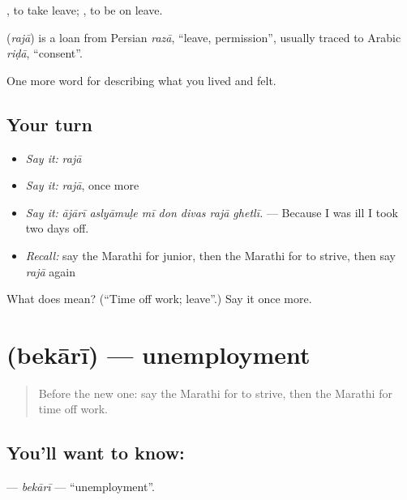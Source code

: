  , to take leave;  , to be on leave.

\begin{cousinweb}
\textbf{} (\emph{rajā}) is a loan from Persian \emph{razā}, \textquotedblleft{}leave, permission\textquotedblright{}, usually traced to Arabic \emph{riḍā}, \textquotedblleft{}consent\textquotedblright{}.
\end{cousinweb}

\begin{grammarlens}[title={What you've built}]
One more word for describing what you lived and felt.
\end{grammarlens}

\subsection*{Your turn}
\begin{itemize}
\raggedright
  \item \emph{Say it:} \emph{rajā}
  \item \emph{Say it:} \emph{rajā}, once more
  \item \emph{Say it:} \emph{ājārī aslyāmuḷe mī don divas rajā ghetlī.} — Because I was ill I took two days off.
  \item \emph{Recall:} say the Marathi for junior, then the Marathi for to strive, then say \emph{rajā} again
\end{itemize}

\begin{tcolorbox}[breakable,colback=teal!4,colframe=teal!35!black,title={Before you move on}]
What does  mean? (\textquotedblleft{}Time off work; leave\textquotedblright{}.) Say it once more.
\end{tcolorbox}
\section[\texorpdfstring{\mr{बेकारी} (bekārī)}{बेकारी (bekārī)}]{ (bekārī) — unemployment}

\label{lesson:MR-C510-bekari}



\begin{quote}
Before the new one: say the Marathi for to strive, then the Marathi for time off work.
\end{quote}

\subsection*{You'll want to know: }
\textbf{} — \emph{bekārī} — \textquotedblleft{}unemployment\textquotedblright{}.

